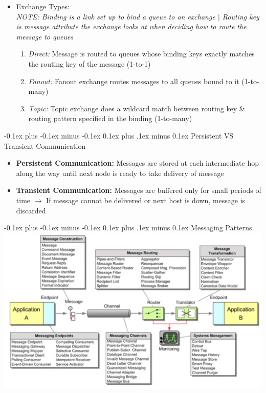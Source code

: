 \documentclass[landscape]{article}
\makeatletter
\renewcommand{\section}{\@startsection{section}{1}{0mm}%
  {-0.1ex plus -0.1ex minus -0.1ex}%
  {0.1ex plus .1ex minus 0.1ex}%
{\normalfont\small\bfseries}}
\renewcommand{\subsection}{\@startsection{subsection}{2}{0mm}%
  {-0.1ex plus -0.1ex minus -0.1ex}%
  {0.1ex plus .1ex minus 0.1ex}%
{\normalfont\scriptsize\bfseries}}
\makeatother
\begin{document}
\begin{multicols*}{5}
\begin{itemize}
\begin{itemize}
        \item \underline{Exchange Types:} \\
        \textit{NOTE: Binding is a link set up to bind a queue to an exchange $|$ Routing key is message attribute the exchange looks at when deciding how to route the message to queues}
        \begin{enumerate}
          \item \textit{Direct:} Message is routed to queues whose binding keys exactly matches the routing key of the message (1-to-1)
          \item \textit{Fanout:} Fanout exchange routes messages to all queues bound to it (1-to-many)
          \item \textit{Topic:} Topic exchange does a wildcard match between routing key \& routing pattern specified in the binding (1-to-many)
        \end{enumerate}
      \end{itemize}
    \end{itemize}

    \subsection{Persistent VS Transient Communication}
    \begin{itemize}
      \item \textbf{Persistent Communication:} Messages are stored at each intermediate hop along the way until next node is ready to take delivery of message
      \item \textbf{Transient Communication:} Messages are buffered only for small periods of time $\rightarrow$ If message cannot be delivered or next host is down, message is discarded
    \end{itemize}

    \section{Messaging Patterns}
    \includegraphics[width=0.85\linewidth]{9_Messaging_Patterns.png}


\end{multicols*}
\end{document}
